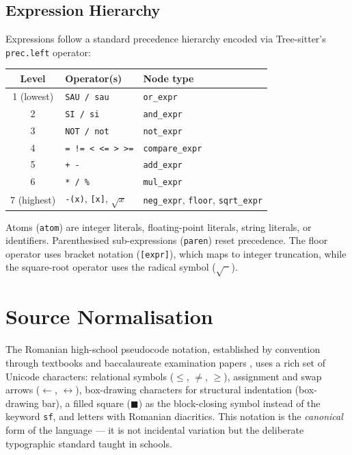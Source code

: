 \subsection{Expression Hierarchy}

Expressions follow a standard precedence hierarchy encoded via Tree-sitter's
\texttt{prec.left} operator:

\begin{center}
\begin{tabular}{c l l}
\hline
\textbf{Level} & \textbf{Operator(s)} & \textbf{Node type} \\
\hline
1 (lowest) & \texttt{SAU / sau}                        & \texttt{or\_expr} \\
2          & \texttt{SI / si}                           & \texttt{and\_expr} \\
3          & \texttt{NOT / not}                         & \texttt{not\_expr} \\
4          & \texttt{= != < <= > >=}                    & \texttt{compare\_expr} \\
5          & \texttt{+ -}                               & \texttt{add\_expr} \\
6          & \texttt{* / \%}                            & \texttt{mul\_expr} \\
7 (highest)& \texttt{-(x)}, \texttt{[x]}, $\sqrt{x}$ & \texttt{neg\_expr}, \texttt{floor}, \texttt{sqrt\_expr} \\
\hline
\end{tabular}
\end{center}

Atoms (\texttt{atom}) are integer literals, floating-point literals, string
literals, or identifiers.  Parenthesised sub-expressions (\texttt{paren}) reset
precedence.  The floor operator uses bracket notation (\texttt{[expr]}), which
maps to integer truncation, while the square-root operator uses the radical
symbol ($\sqrt{\phantom{x}}$).

\section{Source Normalisation}
\label{sec:formatter}

The Romanian high-school pseudocode notation, established by convention
through textbooks and baccalaureate examination papers \cite{romanian-curriculum},
uses a rich set
of Unicode characters: relational symbols ($\leq$, $\neq$, $\geq$), assignment and
swap arrows ($\leftarrow$, $\leftrightarrow$), box-drawing characters for
structural indentation (box-drawing bar), a filled square ($\blacksquare$) as the
block-closing symbol instead of the keyword \texttt{sf}, and letters with
Romanian diacritics.  This notation is the \emph{canonical} form of the
language --- it is not incidental variation but the deliberate typographic
standard taught in schools.

